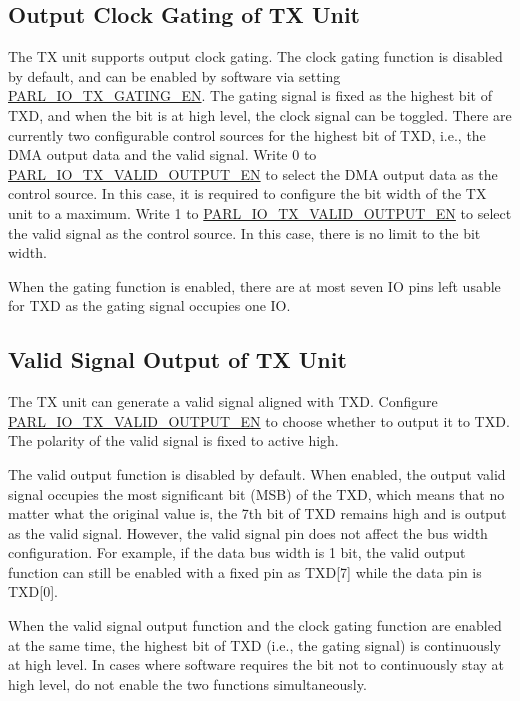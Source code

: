 \documentclass[main\_\_EN.tex]{subfiles}
\begin{document}
\subsection{Output Clock Gating of TX Unit}

The TX unit supports output clock gating. The clock gating function is disabled by default, and can be enabled by software via setting \hyperref[fielddesc:PARLIOTXGATINGEN]{PARL\_IO\_TX\_GATING\_EN}. The gating signal is fixed as the highest bit of TXD, and when the bit is at high level, the clock signal can be toggled. There are currently two configurable control sources for the highest bit of TXD, i.e., the DMA output data and the valid signal. Write 0 to \hyperref[fielddesc:PARLIOTXVALIDOUTPUTEN]{PARL\_IO\_TX\_VALID\_OUTPUT\_EN} to select the DMA output data as the control source. In this case, it is required to configure the bit width of the TX unit to a maximum. Write 1 to \hyperref[fielddesc:PARLIOTXVALIDOUTPUTEN]{PARL\_IO\_TX\_VALID\_OUTPUT\_EN} to select the valid signal as the control source. In this case, there is no limit to the bit width.

When the gating function is enabled, there are at most seven IO pins left usable for TXD as the gating signal occupies one IO.

\subsection{Valid Signal Output of TX Unit }

The TX unit can generate a valid signal aligned with TXD. Configure \hyperref[fielddesc:PARLIOTXVALIDOUTPUTEN]{PARL\_IO\_TX\_VALID\_OUTPUT\_EN} to choose whether to output it to TXD. The polarity of the valid signal is fixed to active high.

The valid output function is disabled by default. When enabled, the output valid signal occupies the most significant bit (MSB) of the TXD, which means that no matter what the original value is, the 7th bit of TXD remains high and is output as the valid signal. However, the valid signal pin does not affect the bus width configuration. For example, if the data bus width is 1 bit, the valid output function can still be enabled with a fixed pin as TXD[7] while the data pin is TXD[0].


\begin{tiplisting}
When the valid signal output function and the clock gating function are enabled at the same time, the highest bit of TXD (i.e., the gating signal) is continuously at high level. In cases where software requires the bit not to continuously stay at high level, do not enable the two functions simultaneously.
\end{tiplisting}
\end{document}
